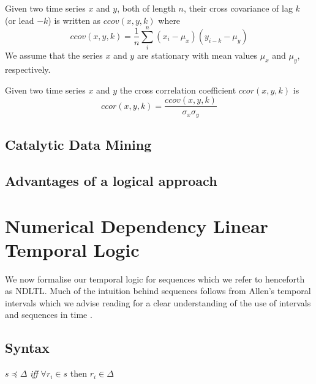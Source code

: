 \begin{definition}\label{def:crosscovar}
\begin{rm}
Given two time series $x$ and $y$, both of length $n$, their
cross covariance of lag $k$
(or lead $-k$) is written as $ccov(x,y,k)$ where
\[
ccov(x,y,k) = \frac{1}{n} \sum_i^n (x_i - \mu_x) (y_{i-k} - \mu_y)
\]
We assume that the series $x$ and $y$ are stationary with mean values
$\mu_x$ and $\mu_y$, respectively.
\end{rm}
\end{definition}
 
 
\begin{definition}\label{def:crosscorrel}
\begin{rm}
Given two time series $x$ and $y$ the cross correlation coefficient $ccor(x,y,k)
$ is
\[
ccor(x,y,k) = \frac{ccov(x,y,k)}{\sigma_x \sigma_y}
\]
\end{rm}
\end{definition}


\subsection{Catalytic Data Mining}


\subsection{Advantages of a logical approach}





\section{Numerical Dependency Linear Temporal Logic}\label{sec:tl_ndltl}


We now formalise our temporal logic for sequences which we refer to
henceforth as NDLTL. Much of the intuition behind sequences follows
from Allen's temporal intervals which we advise reading for a clear
understanding of the use of intervals and sequences in time
\cite{all84}.


\subsection{Syntax}


\begin{definition}
\begin{rm}
$s \preceq \Delta$ {\em iff} $\forall r_i \in s$ then $r_i \in \Delta$
\end{rm}
\end{definition}

